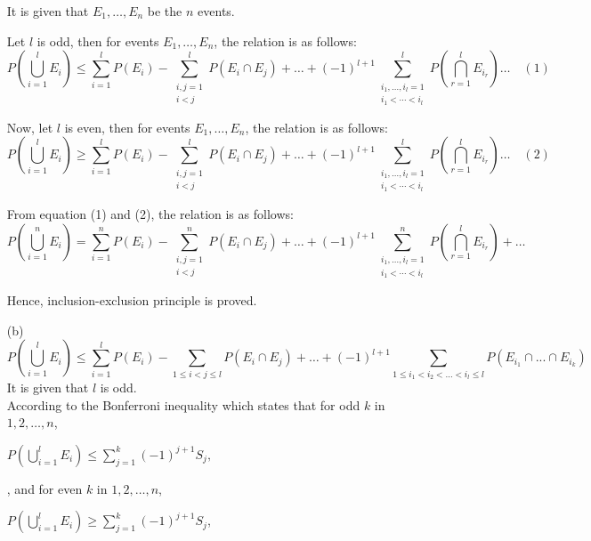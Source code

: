 \documentclass{article}
\begin{document}
\begin{enumerate}
  It is given that \( E_1, \ldots, E_n \) be the \( n \) events.
  
  Let \( l \) is odd, then for events \( E_1, \ldots, E_n \), the relation is as follows:
  \begin{equation*}
  P\left(\bigcup_{i=1}^{l} E_i\right) \leq \sum_{i=1}^{l} P(E_i) - \sum_{\substack{i,j=1 \\ i < j}}^{l} P(E_i \cap E_j) + \ldots + (-1)^{l+1} \sum_{\substack{i_1,\ldots,i_l=1 \\ i_1 < \cdots < i_l}}^{l} P\left(\bigcap_{r=1}^{l} E_{i_r}\right) \ldots \quad (1)
  \end{equation*}
  
  Now, let \( l \) is even, then for events \( E_1, \ldots, E_n \), the relation is as follows:
  \begin{equation*}
  P\left(\bigcup_{i=1}^{l} E_i\right) \geq \sum_{i=1}^{l} P(E_i) - \sum_{\substack{i,j=1 \\ i < j}}^{l} P(E_i \cap E_j) + \ldots + (-1)^{l+1} \sum_{\substack{i_1,\ldots,i_l=1 \\ i_1 < \cdots < i_l}}^{l} P\left(\bigcap_{r=1}^{l} E_{i_r}\right) \ldots \quad (2)
  \end{equation*}
  
  From equation (1) and (2), the relation is as follows:
  \begin{equation*}
  P\left(\bigcup_{i=1}^{n} E_i\right) = \sum_{i=1}^{n} P(E_i) - \sum_{\substack{i,j=1 \\ i < j}}^{n} P(E_i \cap E_j) + \ldots + (-1)^{l+1} \sum_{\substack{i_1,\ldots,i_l=1 \\ i_1 < \cdots < i_l}}^{n} P\left(\bigcap_{r=1}^{l} E_{i_r}\right) + \ldots
  \end{equation*}
  
  Hence, inclusion-exclusion principle is proved. 
  \item[(b)]
  \begin{equation*}
  P\left(\bigcup_{i=1}^{l} E_i\right) \leq \sum_{i=1}^{l} P(E_i) - \sum_{1 \leq i < j \leq l} P(E_i \cap E_j) + \ldots + (-1)^{l+1} \sum_{1 \leq i_1 < i_2 < \dots < i_l \leq l} P\left(E_{i_1}\cap...\cap E_{i_k}\right)
  \end{equation*}
  It is given that \( l \) is odd.\\
  According to the Bonferroni inequality which states that for odd \( k \) in \( 1,2,\ldots,n \),
  \begin{center}
    $P\left(\bigcup_{i=1}^{l} E_i\right) \leq \sum_{j=1}^{k} (-1)^{j+1} S_j,$  
  \end{center}
  , and for even \( k \) in \( 1,2,\ldots,n \),
  \begin{center}
      $P\left(\bigcup_{i=1}^{l} E_i\right) \geq \sum_{j=1}^{k} (-1)^{j+1} S_j$,
  \end{center}


\end{enumerate}
\end{document}
